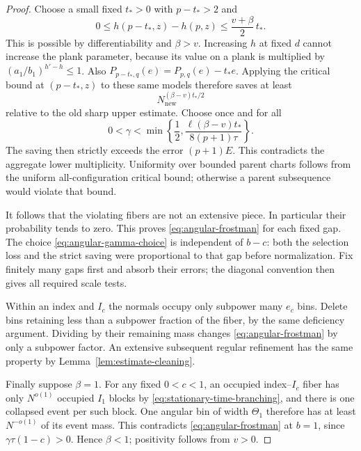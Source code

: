 \begin{proof}
Choose a small fixed $t_*>0$ with $p-t_*>2$ and
\begin{equation}
 0\le h(p-t_*,z)-h(p,z)
 \le \frac{v+\beta}{2}\,t_*.
\label{eq:angular-p-perturbation}
\end{equation}
This is possible by differentiability and $\beta>v$.
Increasing $h$ at fixed $d$ cannot increase the plank parameter,
because its value on a plank is multiplied by
$(a_1/b_1)^{h'-h}\le1$. Also
$P_{p-t_*,q}(e)=P_{p,q}(e)-t_*e$. Applying the critical bound at
$(p-t_*,z)$ to these same models therefore saves at least
\[
 N_{\mathrm{new}}^{(\beta-v)t_*/2}
\]
relative to the old sharp upper estimate. Choose once and for all
\begin{equation}
 0<\gamma<\min\left\{
 \frac12,\frac{\ell(\beta-v)t_*}{8(p+1)\tau}
 \right\}.
\label{eq:angular-gamma-choice}
\end{equation}
The saving then strictly exceeds the error $(p+1)E$. This contradicts
the aggregate lower multiplicity. Uniformity over bounded parent
charts follows from the uniform all-configuration critical bound;
otherwise a parent subsequence would violate that bound.

It follows that the violating fibers are not an extensive piece.
In particular their probability tends to zero. This proves
\eqref{eq:angular-frostman} for each fixed gap. The choice
\eqref{eq:angular-gamma-choice} is independent of $b-c$: both the
selection loss and the strict saving were proportional to that gap
before normalization. Fix finitely many gaps first and absorb their
errors; the diagonal convention then gives all required scale tests.

Within an index and $I_c$ the normals occupy only subpower many
$e_c$ bins. Delete bins retaining less than a subpower fraction of the
fiber, by the same deficiency argument. Dividing by their remaining
mass changes \eqref{eq:angular-frostman} by only a subpower factor.
An extensive subsequent regular refinement has the same property by
Lemma~\ref{lem:estimate-cleaning}.

Finally suppose $\beta=1$. For any fixed $0<c<1$, an occupied
index--$I_c$ fiber has only $N^{o(1)}$ occupied $I_1$ blocks by
\eqref{eq:stationary-time-branching}, and there is one collapsed
event per such block. One angular bin of width $\Theta_1$ therefore
has at least $N^{-o(1)}$ of its event mass. This contradicts
\eqref{eq:angular-frostman} at $b=1$, since $\gamma\tau(1-c)>0$.
Hence $\beta<1$; positivity follows from $v>0$.
\end{proof}

